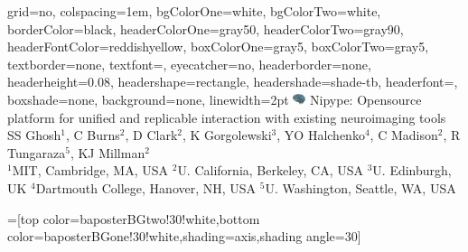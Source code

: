 \documentclass[portrait,final]{baposter}
\begin{document}
\newlength{\leftimgwidth}
\begin{poster}%
  {
  grid=no,
  colspacing=1em,
  bgColorOne=white,
  bgColorTwo=white,
  borderColor=black,
  headerColorOne=gray50,
  headerColorTwo=gray90,
  headerFontColor=reddishyellow,
  boxColorOne=gray5,
  boxColorTwo=gray5,
  textborder=none, %
  textfont=\sf, %
  eyecatcher=no,
  headerborder=none,
  headerheight=0.08\textheight,
  headershape=rectangle,
  headershade=shade-tb,
  headerfont=\Large\textsf, %
  boxshade=none, %
  background=none,
  linewidth=2pt
  }
  {\includegraphics[width=1em]{nipylogo}} %
  {\sf %
  Nipype: Opensource platform for unified and replicable interaction
  with existing neuroimaging tools\vspace{0.15em}}
  {\sf %
    SS Ghosh$^1$, C Burns$^2$, D Clark$^2$, K Gorgolewski$^3$, YO
    Halchenko$^4$, C Madison$^2$, R Tungaraza$^5$, KJ
    Millman$^2$\\
    \small\sf$^1$MIT, Cambridge, MA, USA $^2$U. California, Berkeley, CA, USA $^3$U. Edinburgh, UK
    $^4$Dartmouth College, Hanover, NH, USA $^5$U. Washington, Seattle, WA, USA\vspace{-0.4em}}


  =[top color=baposterBGtwo!30!white,bottom color=baposterBGone!30!white,shading=axis,shading angle=30]

     \setlength{\leftimgwidth}{0.78em+8.0em}


\end{poster}
\end{document}
